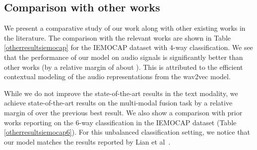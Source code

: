 \documentclass[lettersize,journal]{IEEEtran}
\begin{document}
\begin{table}[t!]
\caption{\label{otherresultsiemocap6}Comparison with other works for IEMOCAP 6-way classification. All scores are the weighted F1 scores. * indicates our implementation.}
    \vspace{-0.1in}

\begin{center}


\end{center}
\end{table}



\subsection{Comparison with other works}
We present a comparative study of our work along with other existing works in the literature.
The comparison with the relevant works are shown in Table \ref{otherresultsiemocap} for the IEMOCAP dataset with 4-way classification. We see that the performance of our model on audio signals is significantly better than other works (by a relative margin of about ). This is attributed to the efficient contextual modeling of the audio representations from the wav2vec model.

While we do not improve the state-of-the-art results in the text modality, we achieve state-of-the-art results on the multi-modal fusion task by a relative margin of  over the previous best result. We also show a comparison with prior works reporting on the 6-way classification in the IEMOCAP dataset (Table \ref{otherresultsiemocap6}). For this unbalanced classification setting, we notice that our model matches the results reported by Lian et al~\cite{lian2022smin}. 
\end{document}
